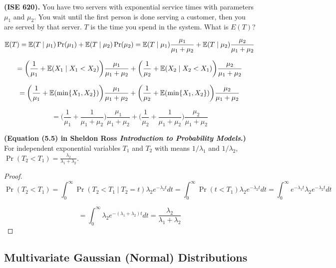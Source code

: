 \begin{example} \textbf{(ISE 620).} You have two servers with exponential service times with parameters \(\mu_1\) and \(\mu_2\). You wait until the first person is done serving a customer, then you are served by that server. \(T\) is the time you spend in the system. What is \(E(T)\)?

\[
\mathbb{E}(T) = \mathbb{E}(T \mid \mu_1) \Pr(\mu_1) + \mathbb{E}(T \mid \mu_2) \Pr(\mu_2) = \mathbb{E}(T \mid \mu_1) \frac{\mu_1}{\mu_1 + \mu_2} + \mathbb{E}(T \mid \mu_2) \frac{\mu_2}{\mu_1 + \mu_2} 
\]

\[
= \bigg( \frac{1}{\mu_1} + \mathbb{E}(X_1 \mid X_1 < X_2) \bigg) \frac{\mu_1}{\mu_1 + \mu_2} +   \bigg( \frac{1}{\mu_2} +  \mathbb{E}(X_2 \mid X_2 < X_1)  \bigg) \frac{\mu_2}{\mu_1 + \mu_2} 
\]

\[
= \bigg( \frac{1}{\mu_1} + \mathbb{E}(\min \{X_1, X_2\} ) \bigg) \frac{\mu_1}{\mu_1 + \mu_2} +   \bigg( \frac{1}{\mu_2} +  \mathbb{E}(\min \{X_1, X_2\} )  \bigg) \frac{\mu_2}{\mu_1 + \mu_2} 
\]

\[
= \bigg( \frac{1}{\mu_1} + \frac{1}{\mu_1 + \mu_2} \bigg) \frac{\mu_1}{\mu_1 + \mu_2} +   \bigg( \frac{1}{\mu_2} + \frac{1}{\mu_1 + \mu_2}   \bigg) \frac{\mu_2}{\mu_1 + \mu_2} 
\]

\end{example}

\begin{proposition} \textbf{(Equation (5.5) in Sheldon Ross \textit{Introduction to Probability Models}.)} For independent exponential variables \(T_1\) and \(T_2\) with means \(1/\lambda_1\) and \(1/\lambda_2\), \(\Pr(T_2 < T_1) =  \frac{\lambda_2}{\lambda_1 + \lambda_2}\).

\end{proposition}

\begin{proof}

\[
\Pr(T_2 < T_1) = \int_0^\infty \Pr(T_2 < T_1 \mid T_2 = t)\lambda_2 e^{-\lambda_2 t} dt = \int_0^\infty \Pr(t < T_1) \lambda_2 e^{-\lambda_2t} dt = \int_0^\infty e^{-\lambda_1t} \lambda_2 e^{-\lambda_2 t} dt 
\]

\[
= \int_0^\infty \lambda_2e^{-(\lambda_1 + \lambda_2)t} dt = \frac{\lambda_2}{\lambda_1 + \lambda_2}
\]

\end{proof}


\subsection{Multivariate Gaussian (Normal) Distributions}


